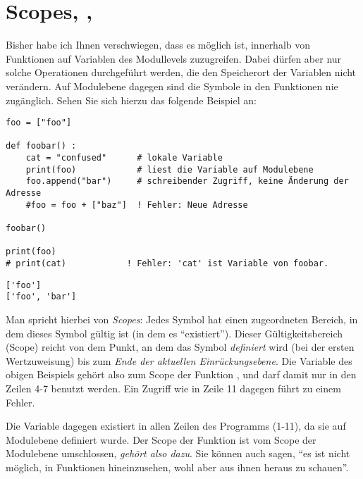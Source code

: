 \section{Scopes, , }
Bisher habe ich Ihnen verschwiegen, dass es möglich ist, innerhalb von Funktionen auf Variablen des Modullevels zuzugreifen. Dabei dürfen aber nur solche Operationen durchgeführt werden, die den Speicherort der Variablen nicht verändern. Auf Modulebene dagegen sind die Symbole in den Funktionen nie zugänglich.
Sehen Sie sich hierzu das folgende Beispiel an:
\begin{codebox}
\begin{verbatim}
foo = ["foo"]

def foobar() :
    cat = "confused"      # lokale Variable
    print(foo)            # liest die Variable auf Modulebene
    foo.append("bar")     # schreibender Zugriff, keine Änderung der Adresse
    #foo = foo + ["baz"]  ! Fehler: Neue Adresse

foobar()

print(foo)
# print(cat)            ! Fehler: 'cat' ist Variable von foobar.
\end{verbatim}
\end{codebox}
\begin{cmdbox}
\begin{verbatim}
['foo']
['foo', 'bar']
\end{verbatim}
\end{cmdbox}

Man spricht hierbei von \emph{Scopes}: Jedes Symbol hat einen zugeordneten Bereich, in dem dieses Symbol gültig ist (in dem es \enquote{existiert}). Dieser Gültigkeitsbereich (Scope) reicht von dem Punkt, an dem das Symbol \emph{definiert} wird (\ie bei der ersten Wertzuweisung) bis zum \emph{Ende der aktuellen Einrückungsebene}. Die Variable  des obigen Beispiels gehört also zum Scope der Funktion , und darf damit nur in den Zeilen 4-7 benutzt werden. Ein Zugriff wie in Zeile 11 dagegen führt zu einem Fehler.

Die Variable  dagegen existiert in allen Zeilen des Programms (1-11), da sie auf Modulebene definiert wurde. Der Scope der Funktion  ist vom Scope der Modulebene umschlossen, \emph{gehört also dazu}. Sie können auch sagen, \enquote{es ist nicht möglich, in Funktionen hineinzusehen, wohl aber aus ihnen heraus zu schauen}.

